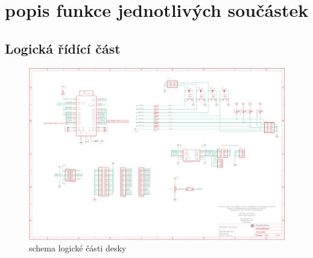 \documentclass{template/socthesis}
\begin{document}
\chapter*{popis funkce jednotlivých součástek}

\section*{Logická řídící část}

	\begin{figure}[h]
		\centering
		\includegraphics[width=\textwidth]{img/logika.png}
		\caption{schema logické části desky}
	\end{figure}
	
	\newpage
	
\end{document}
